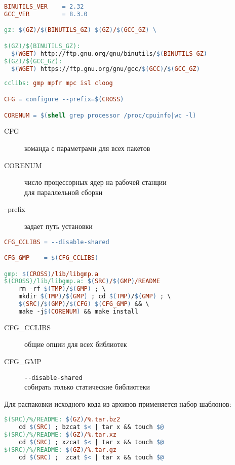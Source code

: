 \clearpage
\begin{lstlisting}[language=make]
BINUTILS_VER	= 2.32
GCC_VER			= 8.3.0

gz: $(GZ)/$(BINUTILS_GZ) $(GZ)/$(GCC_GZ) \

$(GZ)/$(BINUTILS_GZ):
  $(WGET) http://ftp.gnu.org/gnu/binutils/$(BINUTILS_GZ)
$(GZ)/$(GCC_GZ):
  $(WGET) https://ftp.gnu.org/gnu/gcc/$(GCC)/$(GCC_GZ)
\end{lstlisting}

\begin{lstlisting}[language=make]
cclibs: gmp mpfr mpc isl cloog

CFG = configure --prefix=$(CROSS)

CORENUM = $(shell grep processor /proc/cpuinfo|wc -l)
\end{lstlisting}


\begin{description}
\item[CFG] команда  с параметрами для всех пакетов
\item[CORENUM] число процессорных ядер на рабочей станции\\ для параллельной
сборки
\item[--prefix] задает путь установки
\end{description}

\begin{lstlisting}[language=make]
CFG_CCLIBS = --disable-shared

CFG_GMP    = $(CFG_CCLIBS)

gmp: $(CROSS)/lib/libgmp.a
$(CROSS)/lib/libgmp.a: $(SRC)/$(GMP)/README
	rm -rf $(TMP)/$(GMP) ; \
	mkdir $(TMP)/$(GMP) ; cd $(TMP)/$(GMP) ; \
	$(SRC)/$(GMP)/$(CFG) $(CFG_GMP) && \
	make -j$(CORENUM) && make install
\end{lstlisting}

\begin{description}
\item[CFG\_CCLIBS] общие опции  для всех библиотек
\item[CFG\_GMP] \verb|--disable-shared|\\ собирать только статические библиотеки
\end{description}

\noindent
Для распаковки исходного кода из архивов применяется набор шаблонов:
\begin{lstlisting}[language=make]
$(SRC)/%/README: $(GZ)/%.tar.bz2
	cd $(SRC) ; bzcat $< | tar x && touch $@
$(SRC)/%/README: $(GZ)/%.tar.xz
	cd $(SRC) ; xzcat $< | tar x && touch $@
$(SRC)/%/README: $(GZ)/%.tar.gz
	cd $(SRC) ;  zcat $< | tar x && touch $@
\end{lstlisting}

